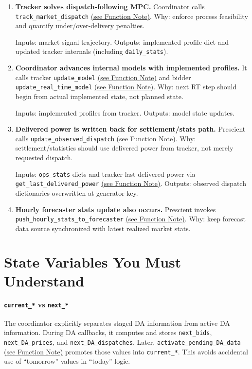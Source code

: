 \documentclass{article}
\begin{document}
\begin{enumerate}[leftmargin=*]
  Inputs: SCED dispatch \texttt{pg} values and DA look-ahead values. Outputs: list \texttt{market\_signals}.

  \item \textbf{Tracker solves dispatch-following MPC.} Coordinator calls \texttt{track\_market\_dispatch} \hyperref[fn:track_market_dispatch]{(see Function Note)}. Why: enforce process feasibility and quantify under/over-delivery penalties.

  Inputs: market signal trajectory. Outputs: implemented profile dict and updated tracker internals (including \texttt{daily\_stats}).

  \item \textbf{Coordinator advances internal models with implemented profiles.} It calls tracker \texttt{update\_model} \hyperref[fn:tracker_update_model]{(see Function Note)} and bidder \texttt{update\_real\_time\_model} \hyperref[fn:update_real_time_model]{(see Function Note)}. Why: next RT step should begin from actual implemented state, not planned state.

  Inputs: implemented profiles from tracker. Outputs: model state updates.

  \item \textbf{Delivered power is written back for settlement/stats path.} Prescient calls \texttt{update\_observed\_dispatch} \hyperref[fn:update_observed_dispatch]{(see Function Note)}. Why: settlement/statistics should use delivered power from tracker, not merely requested dispatch.

  Inputs: \texttt{ops\_stats} dicts and tracker last delivered power via \texttt{get\_last\_delivered\_power} \hyperref[fn:get_last_delivered_power]{(see Function Note)}. Outputs: observed dispatch dictionaries overwritten at generator key.

  \item \textbf{Hourly forecaster stats update also occurs.} Prescient invokes \texttt{push\_hourly\_stats\_to\_forecaster} \hyperref[fn:push_hourly_stats_to_forecaster]{(see Function Note)}. Why: keep forecast data source synchronized with latest realized market stats.
\end{enumerate}

\section{State Variables You Must Understand}
\paragraph{\texttt{current\_*} vs \texttt{next\_*}}
The coordinator explicitly separates staged DA information from active DA information. During DA callbacks, it computes and stores \texttt{next\_bids}, \texttt{next\_DA\_prices}, and \texttt{next\_DA\_dispatches}. Later, \texttt{activate\_pending\_DA\_data} \hyperref[fn:activate_pending_DA_data]{(see Function Note)} promotes those values into \texttt{current\_*}. This avoids accidental use of ``tomorrow'' values in ``today'' logic.
\end{document}
